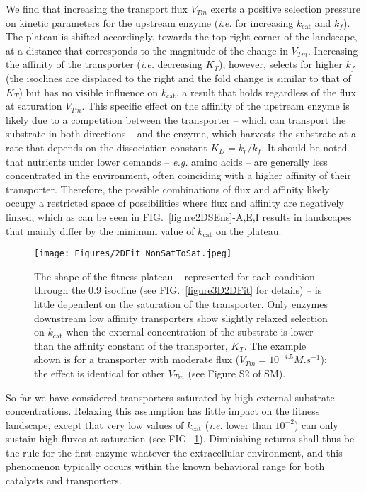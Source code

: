 \documentclass[11pt,onecolumn]{article}
\begin{document}
We find that increasing the transport flux $V_{Tm}$ exerts a positive selection pressure on kinetic parameters for the upstream enzyme (\textit{i.e.} for increasing $k_\text{cat}$ and $k_f$). The plateau is shifted accordingly, towards the top-right corner of the landscape, at a distance that corresponds to the magnitude of the change in $V_{Tm}$. Increasing the affinity of the transporter (\textit{i.e.} decreasing $K_T$), however, selects for higher $k_{f}$ (the isoclines are displaced to the right and the fold change is similar to that of $K_T$) but has no visible influence on $k_\text{cat}$, a result that holds regardless of the flux at saturation $V_{Tm}$. 
This specific effect on the affinity of the upstream enzyme is likely due to a competition between the transporter -- which can transport the substrate in both directions -- and the enzyme, which harvests the substrate at a rate that depends on the dissociation constant $K_D=k_r/k_f$. It should be noted that nutrients under lower demands -- \textit{e.g.} amino acids -- are generally less concentrated in the environment, often coinciding with a higher affinity of their transporter. Therefore, the possible combinations of flux and affinity likely occupy a restricted space of possibilities where flux and affinity are negatively linked, which as can be seen in FIG.~\ref{figure2DSEns}-A,E,I results in landscapes that mainly differ by the minimum value of $k_\text{cat}$ on the plateau.

\begin{figure}[h!]
\centering
\texttt{[image: Figures/2DFit\_NonSatToSat.jpeg]} 
\caption{The shape of the fitness plateau -- represented for each condition through the $0.9$ isocline (see FIG.~\ref{figure3D2DFit} for details) -- is little dependent on the saturation of the transporter. Only enzymes downstream low affinity transporters show slightly relaxed selection on $k_\text{cat}$ when the external concentration of the substrate is lower than the affinity constant of the transporter, $K_T$. The example shown is for a transporter with moderate flux ($V_{Tm}=10^{-4.5}M.s^{-1}$); the effect is identical for other $V_{Tm}$ (see Figure S2 of SM).}
\label{figure2DSSatStud}
\end{figure}

So far we have considered transporters saturated by high external substrate concentrations. Relaxing this assumption has little impact on the fitness landscape, except that very low values of $k_\text{cat}$ (\textit{i.e.} lower than $10^{-2}$) can   only sustain high fluxes at saturation (see FIG.~\ref{figure2DSSatStud}). Diminishing returns shall thus be the rule for the first enzyme whatever the extracellular environment, and this phenomenon typically occurs within the known behavioral range for both catalysts and transporters.
\end{document}
